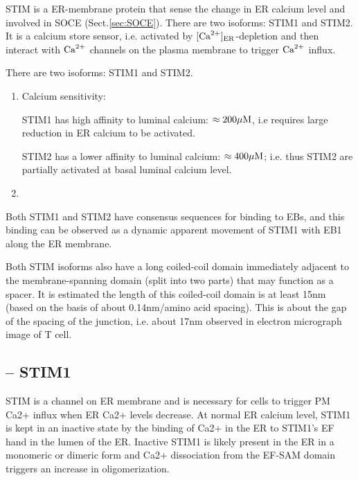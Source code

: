 STIM is a ER-membrane protein that sense the change in ER calcium level and
involved in SOCE (Sect.\ref{sec:SOCE}).
There are two isoforms: STIM1 and STIM2. It is a calcium store sensor, i.e.
activated by $[{\text{Ca}^{2+}}]_{\text{ER}}$-depletion and then interact with ${\text{Ca}^{2+}}$ channels on the
plasma membrane to trigger ${\text{Ca}^{2+}}$ influx.

There are two isoforms: STIM1 and STIM2.

\begin{enumerate}
  \item Calcium sensitivity: 
  
  STIM1 has high affinity to luminal calcium: $\approx 200 {\mu\text{M}}$, i.e requires
  large reduction in ER calcium to be activated.
  
  STIM2 has a lower affinity to luminal calcium: $\approx 400 {\mu\text{M}}$; i.e. thus
  STIM2 are partially activated at basal luminal calcium level.
  
  \item 
\end{enumerate}

Both STIM1 and STIM2 have consensus sequences for binding to EBs, and this
binding can be observed as a dynamic apparent movement of STIM1 with EB1 along
the ER membrane.

Both STIM isoforms also have a long coiled-coil
domain immediately adjacent to the membrane-spanning domain (split into two parts) that
may function as a spacer. It is estimated the length of this coiled-coil
domain is at least 15nm (based on the basis of about 0.14nm/amino acid spacing). 
This is about the gap of the spacing of the junction, i.e. about 17nm observed
in electron micrograph image of T cell.

\subsection{ -- STIM1}
\label{sec:STIM1}

STIM is a channel on ER membrane and is necessary for cells to trigger PM Ca2+
influx when ER Ca2+ levels decrease. At normal ER calcium level, STIM1 is kept
in an inactive state by the binding of Ca2+ in the ER to STIM1's EF hand in the
lumen of the ER. Inactive STIM1 is likely present in the ER in a monomeric or
dimeric form and Ca2+ dissociation from the EF-SAM domain triggers an increase in
oligomerization.


